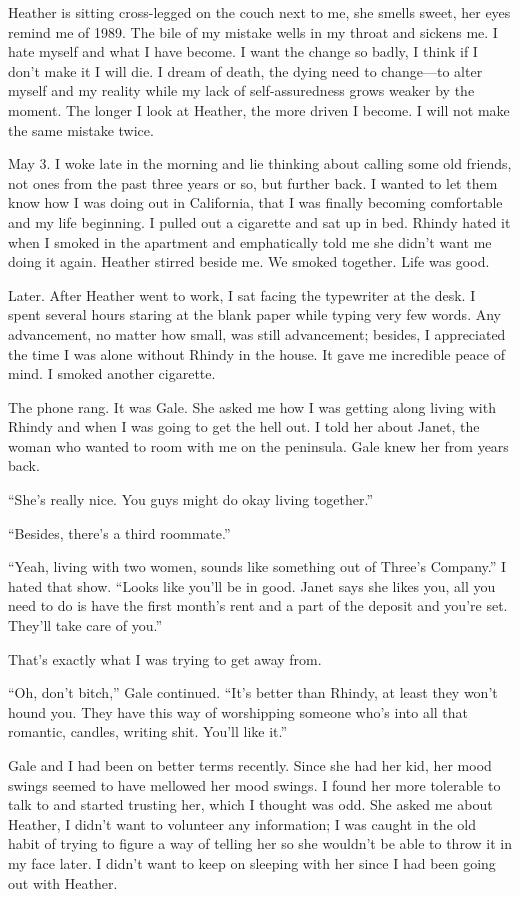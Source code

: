 Heather is sitting cross-legged on the couch next to me, she smells
sweet, her eyes remind me of 1989. The bile of my mistake wells in my
throat and sickens me. I hate myself and what I have become. I want the
change so badly, I think if I don't make it I will die. I dream of
death, the dying need to change---to alter myself and my reality while
my lack of self-assuredness grows weaker by the moment. The longer I
look at Heather, the more driven I become. I will not make the same
mistake twice.

May 3. I woke late in the morning and lie thinking about calling some
old friends, not ones from the past three years or so, but further back.
I wanted to let them know how I was doing out in California, that I was
finally becoming comfortable and my life beginning. I pulled out a
cigarette and sat up in bed. Rhindy hated it when I smoked in the
apartment and emphatically told me she didn't want me doing it again.
Heather stirred beside me. We smoked together. Life was good.

Later. After Heather went to work, I sat facing the typewriter at the
desk. I spent several hours staring at the blank paper while typing very
few words. Any advancement, no matter how small, was still advancement;
besides, I appreciated the time I was alone without Rhindy in the house.
It gave me incredible peace of mind. I smoked another cigarette.

The phone rang. It was Gale. She asked me how I was getting along living
with Rhindy and when I was going to get the hell out. I told her about
Janet, the woman who wanted to room with me on the peninsula. Gale knew
her from years back.

``She's really nice. You guys might do okay living together.''

``Besides, there's a third roommate.''

``Yeah, living with two women, sounds like something out of Three's
Company.'' I hated that show. ``Looks like you'll be in good. Janet says
she likes you, all you need to do is have the first month's rent and a
part of the deposit and you're set. They'll take care of you.''

That's exactly what I was trying to get away from.

``Oh, don't bitch,'' Gale continued. ``It's better than Rhindy, at least
they won't hound you. They have this way of worshipping someone who's
into all that romantic, candles, writing shit. You'll like it.''

Gale and I had been on better terms recently. Since she had her kid, her
mood swings seemed to have mellowed her mood swings. I found her more
tolerable to talk to and started trusting her, which I thought was odd.
She asked me about Heather, I didn't want to volunteer any information;
I was caught in the old habit of trying to figure a way of telling her
so she wouldn't be able to throw it in my face later. I didn't want to
keep on sleeping with her since I had been going out with Heather.

